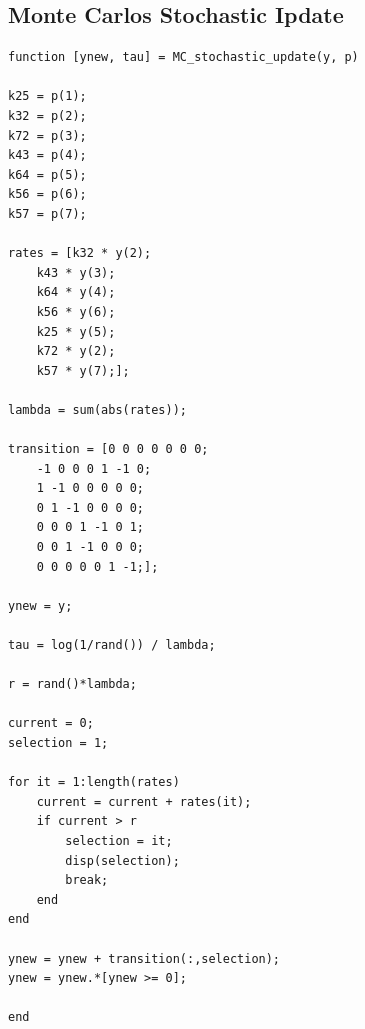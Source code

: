 \documentclass[fleqn,10pt]{wlscirep}
\begin{document}
\subsection*{Monte Carlos Stochastic Ipdate}
\begin{lstlisting}
function [ynew, tau] = MC_stochastic_update(y, p)

k25 = p(1);
k32 = p(2);
k72 = p(3);
k43 = p(4);
k64 = p(5);
k56 = p(6);
k57 = p(7);

rates = [k32 * y(2);
    k43 * y(3);
    k64 * y(4);
    k56 * y(6);
    k25 * y(5);
    k72 * y(2);
    k57 * y(7);];

lambda = sum(abs(rates));

transition = [0 0 0 0 0 0 0;
    -1 0 0 0 1 -1 0;
    1 -1 0 0 0 0 0;
    0 1 -1 0 0 0 0;
    0 0 0 1 -1 0 1;
    0 0 1 -1 0 0 0;
    0 0 0 0 0 1 -1;];

ynew = y;

tau = log(1/rand()) / lambda;

r = rand()*lambda;

current = 0;
selection = 1;

for it = 1:length(rates)
    current = current + rates(it);
    if current > r
        selection = it;
        disp(selection);
        break;
    end
end

ynew = ynew + transition(:,selection);
ynew = ynew.*[ynew >= 0];

end

\end{lstlisting}
\end{document}
